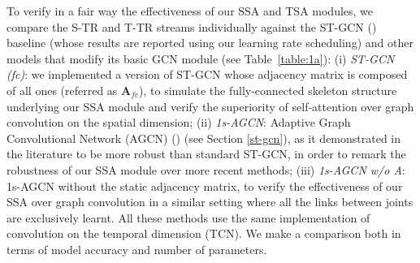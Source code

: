 \documentclass[times,twocolumn,final,authoryear]{elsarticle}
\begin{document}
To verify in a fair way the effectiveness of our SSA and TSA modules, we compare the S-TR and T-TR streams individually against the ST-GCN (\cite{yan2018spatial}) baseline (whose results are reported using our learning rate scheduling) and other models that modify its basic GCN module (see Table~\ref{table:1a}): (i) \textit{ST-GCN (fc)}: we implemented a version of ST-GCN whose adjacency matrix is composed of all ones (referred as $\mathbf{A}_{fc}$), to simulate the fully-connected skeleton structure underlying our SSA module and verify the superiority of self-attention over graph convolution on the spatial dimension; (ii) \textit{1s-AGCN}: Adaptive Graph Convolutional Network (AGCN) (\cite{Shi2018TwoStreamAG}) (see Section \ref{st-gcn}), as it demonstrated in the literature to be more robust than standard ST-GCN, in order to remark the robustness of our SSA module over more recent methods; (iii) \textit{1s-AGCN w/o A}: 1s-AGCN without the static adjacency matrix, to verify the effectiveness of our SSA over graph convolution in a similar setting where all the links between joints are exclusively learnt. 
All these methods use the same implementation of convolution on the temporal dimension (TCN). We make a comparison both in terms of model accuracy and number of parameters.
\setlength{\tabcolsep}{0.5pt}
\end{document}
